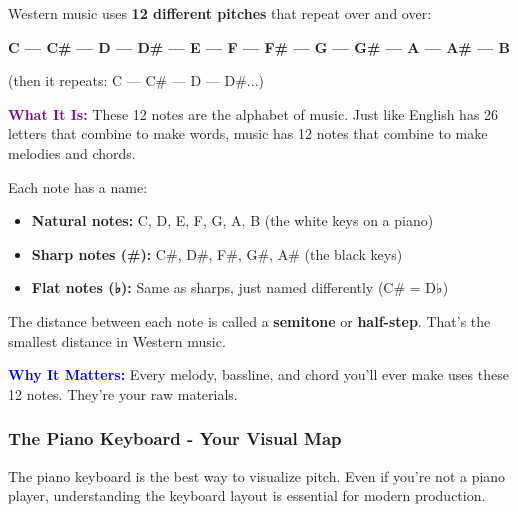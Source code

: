 \documentclass[11pt,letterpaper]{article}
\newcommand{\purple}[1]{\textcolor{purple}{\textbf{#1}}}
\newcommand{\bluepurple}[1]{\textcolor{blue}{\textbf{#1}}}
\begin{document}
Western music uses \textbf{12 different pitches} that repeat over and over:

\begin{center}
\textbf{C — C\# — D — D\# — E — F — F\# — G — G\# — A — A\# — B}

(then it repeats: C — C\# — D — D\#...)
\end{center}

\textbf{\purple{What It Is:}} These 12 notes are the alphabet of music. Just like English has 26 letters that combine to make words, music has 12 notes that combine to make melodies and chords.

Each note has a name:
\begin{itemize}[leftmargin=*]
\item \textbf{Natural notes:} C, D, E, F, G, A, B (the white keys on a piano)
\item \textbf{Sharp notes (\#):} C\#, D\#, F\#, G\#, A\# (the black keys)
\item \textbf{Flat notes (♭):} Same as sharps, just named differently (C\# = D♭)
\end{itemize}

The distance between each note is called a \textbf{semitone} or \textbf{half-step}. That's the smallest distance in Western music.

\textbf{\bluepurple{Why It Matters:}} Every melody, bassline, and chord you'll ever make uses these 12 notes. They're your raw materials.

\subsubsection{The Piano Keyboard - Your Visual Map}

The piano keyboard is the best way to visualize pitch. Even if you're not a piano player, understanding the keyboard layout is essential for modern production.
\end{document}
